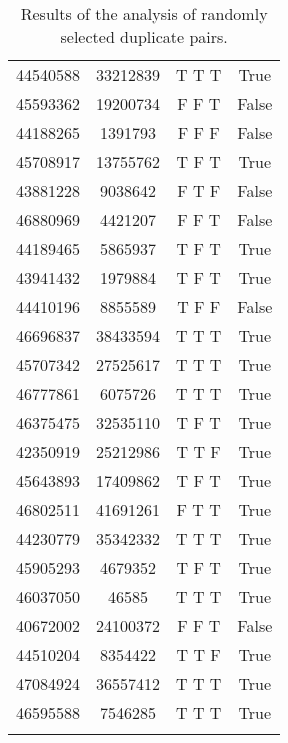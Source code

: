 \begin{longtable}[c]{c c c c}
	44540588 & 33212839 & T T T & True \\
	45593362 & 19200734 & F F T & False \\
	44188265 & 1391793 & F F F & False \\
	45708917 & 13755762 & T F T & True \\
	43881228 & 9038642 & F T F & False \\
	46880969 & 4421207 & F F T & False \\
	44189465 & 5865937 & T F T & True \\
	43941432 & 1979884 & T F T & True \\
	44410196 & 8855589 & T F F & False \\
	46696837 & 38433594 & T T T & True \\
	45707342 & 27525617 & T T T & True \\
	46777861 & 6075726 & T T T & True \\
	46375475 & 32535110 & T F T & True \\
	42350919 & 25212986 & T T F & True \\
	45643893 & 17409862 & T F T & True \\
	46802511 & 41691261 & F T T & True \\
	44230779 & 35342332 & T T T & True \\
	45905293 & 4679352 & T F T & True \\
	46037050 & 46585 & T T T & True \\
	40672002 & 24100372 & F F T & False \\
	44510204 & 8354422 & T T F & True \\
	47084924 & 36557412 & T T T & True \\
	46595588 & 7546285 & T T T & True \\
	\hline
	\caption{Results of the analysis of randomly selected duplicate pairs. \label{survey_duplicates}}\\
\end{longtable}

\newpage
